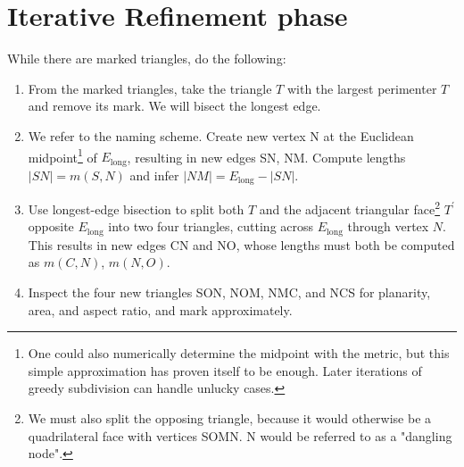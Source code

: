 \section{Iterative Refinement phase}
While there are marked triangles, do the following:
\begin{enumerate}
    \item From the marked triangles, take the triangle $T$ with the largest perimenter $T$ and remove its mark. We will bisect the longest edge.
    \item We refer to the naming scheme. Create new vertex N at the Euclidean midpoint\footnote{One could also numerically determine the midpoint with the metric, but this simple approximation has proven itself to be enough. Later iterations of greedy subdivision can handle unlucky cases.} of $E_{\text{long}}$, resulting in new edges SN, NM. Compute lengths $|SN| = m(S, N)$ and infer $|NM| = E_{\text{long}} - |SN|$.  
    \item Use longest-edge bisection\cite{longest_edge_bisection} to split both $T$ and the adjacent triangular face\footnote{We must also split the opposing triangle, because it would otherwise be a quadrilateral face with vertices SOMN. N would be referred to as a "dangling node".} $T^\prime$ opposite $E_{\text{long}}$ into two four triangles, cutting across $E_{\text{long}}$ through vertex $N$. This results in new edges CN and NO, whose lengths must both be computed as $m(C,N)$, $m(N,O)$.
    \item  Inspect the four new triangles SON, NOM, NMC, and NCS for planarity, area, and aspect ratio, and mark approximately.
\end{enumerate}
